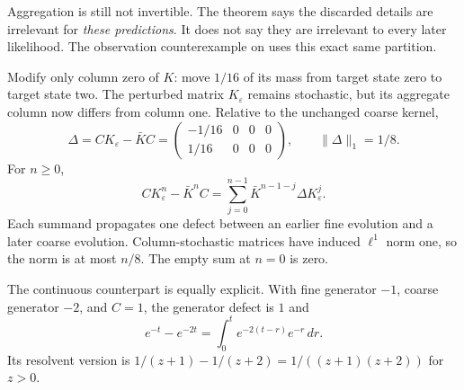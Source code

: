 Aggregation is still not invertible. The theorem says the discarded details are irrelevant for \emph{these predictions}. It does not say they are irrelevant to every later likelihood. The observation counterexample on  uses this exact same partition.

Modify only column zero of $K$: move $1/16$ of its mass from target state zero to target state two. The perturbed matrix $K_\varepsilon$ remains stochastic, but its aggregate column now differs from column one. Relative to the unchanged coarse kernel,
\[
\Delta=CK_\varepsilon-\bar KC
=\begin{pmatrix}-1/16&0&0&0\\1/16&0&0&0\end{pmatrix},
\qquad \|\Delta\|_1=1/8.
\]
For $n\ge0$,
\[
CK_\varepsilon^n-\bar K^nC
=\sum_{j=0}^{n-1}\bar K^{n-1-j}\Delta K_\varepsilon^j.
\]
Each summand propagates one defect between an earlier fine evolution and a later coarse evolution. Column-stochastic matrices have induced $\ell^1$ norm one, so the norm is at most $n/8$. The empty sum at $n=0$ is zero.

The continuous counterpart is equally explicit. With fine generator $-1$, coarse generator $-2$, and $C=1$, the generator defect is $1$ and
\[
e^{-t}-e^{-2t}=\int_0^t e^{-2(t-r)}e^{-r}\,dr.
\]
Its resolvent version is $1/(z+1)-1/(z+2)=1/((z+1)(z+2))$ for $z>0$.


